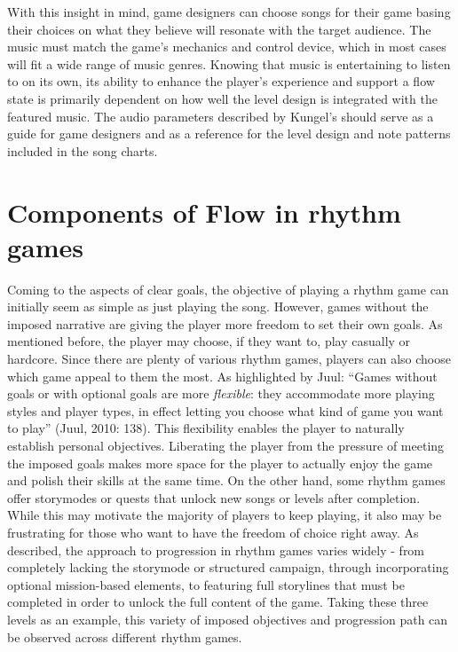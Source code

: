 With this insight in mind, game designers can choose songs for their game basing their choices on what they believe will resonate with the target audience. The music must match the game’s mechanics and control device, which in most cases will fit a wide range of music genres. Knowing that music is entertaining to listen to on its own, its ability to enhance the player’s experience and support a flow state is primarily dependent on how well the level design is integrated with the featured music. The audio parameters described by Kungel’s should serve as a guide for game designers and as a reference for the level design and note patterns included in the song charts.

\section{Components of Flow in rhythm games}
Coming to the aspects of clear goals, the objective of playing a rhythm game can initially seem as simple as just playing the song. However, games without the imposed narrative are giving the player more freedom to set their own goals. As mentioned before, the player may choose, if they want to, play casually or hardcore. Since there are plenty of various rhythm games, players can also choose which game appeal to them the most. As highlighted by Juul: ``Games without goals or with optional goals are more \textit{flexible}: they accommodate more playing styles and player types, in effect letting you choose what kind of game you want to play'' (Juul, 2010: 138). This flexibility enables the player to naturally establish personal objectives. Liberating the player from the pressure of meeting the imposed goals makes more space for the player to actually enjoy the game and polish their skills at the same time. On the other hand, some rhythm games offer storymodes or quests that unlock new songs or levels after completion. While this may motivate the majority of players to keep playing, it also may be frustrating for those who want to have the freedom of choice right away.
As described, the approach to progression in rhythm games varies widely - from completely lacking the storymode or structured campaign, through incorporating optional mission-based elements, to featuring full storylines that must be completed in order to unlock the full content of the game. Taking these three levels as an example, this variety of imposed objectives and progression path can be observed across different rhythm games.
